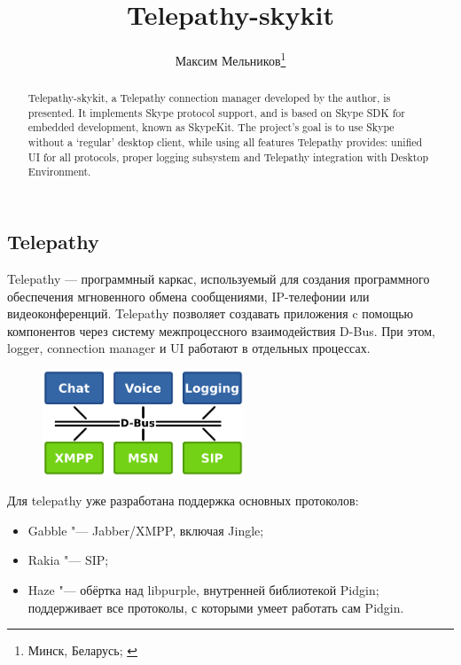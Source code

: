 \documentclass[10pt, a5paper]{article}
\begin{document}
\title{Telepathy-skykit}%

\author{Максим Мельников\footnote{Минск, Беларусь; \url{}}}
\maketitle

\begin{abstract}
Telepathy-skykit, a Telepathy connection manager developed by the author, is presented. It implements Skype protocol support, and is based on Skype SDK for embedded development, known as SkypeKit. The project's goal is to use Skype without a `regular' desktop client, while using all features Telepathy provides: unified UI for all protocols, proper logging subsystem and Telepathy integration with Desktop Environment.
\end{abstract}

\subsection*{Telepathy}

Telepathy — программный каркас, используемый для создания программного обеспечения мгновенного обмена сообщениями, IP-телефонии или видеоконференций. Telepathy позволяет создавать приложения c помощью компонентов через систему межпроцессного взаимодействия D-Bus. При этом, logger, connection manager и UI работают в отдельных процессах.

\begin{figure}[t]
  \centering
  \includegraphics[width=6cm]{101_2013_w_Melnikau_tao}
\end{figure}

Для telepathy уже разработана поддержка основных протоколов:
\begin{itemize}
\item Gabble "--- Jabber/XMPP, включая Jingle;
\item Rakia "--- SIP;
\item Haze "--- обёртка над libpurple, внутренней библиотекой Pidgin; поддерживает все протоколы, с которыми умеет работать сам Pidgin.
\end{itemize}
\end{document}
